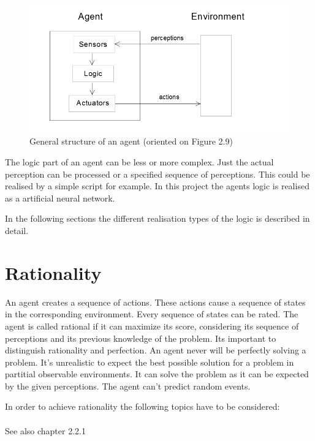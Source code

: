 \documentclass[10pt,a4paper,DIV=11]{scrreprt}
\begin{document}
\begin{center}
	\begin{figure}[H]
		\centering
		\includegraphics[width=1.0\textwidth,scale=1]{files/agent.png}  
		\caption{General structure of an agent (oriented on \cite{ai} Figure 2.9)} 
		\label{fig:agent}
	\end{figure}
\end{center}

The logic part of an agent can be less or more complex. Just the actual perception can be processed or a specified sequence of perceptions. This could be realised by a simple script for example.
In this project the agents logic is realised as a artificial neural network.

In the following sections the different realisation types of the logic is described in detail.


\section{Rationality \cite{ai}}
An agent creates a sequence of actions. These actions cause a sequence of states in the corresponding environment. Every sequence of states can be rated. The agent is called rational if it can maximize its score, considering its sequence of perceptions and its previous knowledge of the problem. Its important to distinguish rationality and perfection. An agent never will be perfectly solving a problem. It's unrealistic to expect the best possible solution for a problem in partitial observable environments. It can solve the problem as it can be expected by the given perceptions. The agent can't predict random events.

In order to achieve rationality the following topics have to be considered: \\

   \\
See also \cite{ai} chapter 2.2.1
\end{document}
